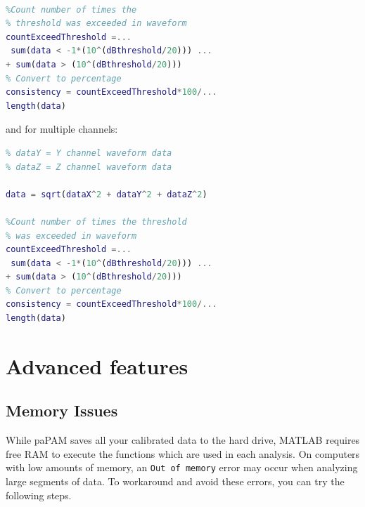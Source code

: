 \documentclass[11pt]{report}
\begin{document}
\begin{itemize}
\begin{lstlisting}[style=github, language=MATLAB]
% data = waveform data

%Count number of times the
% threshold was exceeded in waveform
countExceedThreshold =...
 sum(data < -1*(10^(dBthreshold/20))) ...
+ sum(data > (10^(dBthreshold/20)))
% Convert to percentage
consistency = countExceedThreshold*100/...
length(data)
\end{lstlisting}

and for multiple channels:
\begin{lstlisting}[style=github, language=MATLAB]
% dataX = X channel waveform data
% dataY = Y channel waveform data
% dataZ = Z channel waveform data

data = sqrt(dataX^2 + dataY^2 + dataZ^2)

%Count number of times the threshold
% was exceeded in waveform
countExceedThreshold =...
 sum(data < -1*(10^(dBthreshold/20))) ...
+ sum(data > (10^(dBthreshold/20)))
% Convert to percentage
consistency = countExceedThreshold*100/...
length(data)
\end{lstlisting}

\end{itemize}

\chapter{Advanced features}
\section{Memory Issues} \label{MemoryIssues}

While paPAM saves all your calibrated data to the hard drive, MATLAB requires free RAM to execute the functions which are used in each analysis.  On computers with low amounts of memory, an \texttt{Out of memory} error may occur when analyzing large segments of data.  To workaround and avoid these errors, you can try the following steps.
\end{document}
